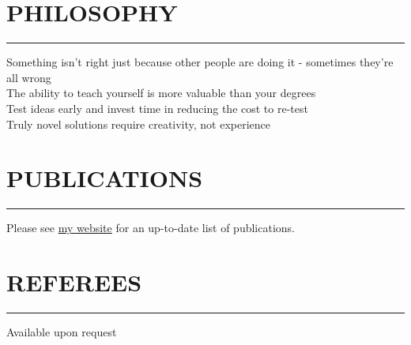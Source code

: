 \documentclass[english]{extarticle}
\newcommand{\mySect}[2]{
    \section*{\textcolor{secondary}{#1}\hfill{\footnotesize\textmd{{#2}}}}
    \vspace{-2em}
    \textcolor{tertiary}{\hrule}
    \vspace{0.5em}
}
\begin{document}
\vspace{1.0cm}

\mySect{PHILOSOPHY}{}
\begin{centering}
\onehalfspacing
\noindent
Something isn't right just because other people are doing it - sometimes they're all wrong\\
\noindent
The ability to teach yourself is more valuable than your degrees\\
\noindent
Test ideas early and invest time in reducing the cost to re-test\\
\noindent
Truly novel solutions require creativity, not experience\\
\end{centering}

\vspace{1.0cm}

\mySect{PUBLICATIONS}{}
\noindent
Please see \href{https://markhedleyjones.com/about}{my website} for an up-to-date list of publications.

\vspace{1.0cm}

\mySect{REFEREES}{}
\noindent
Available upon request
\end{document}
